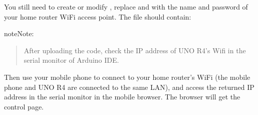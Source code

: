 \documentclass[a4paper,11pt,english]{sphinxmanual}
\begin{document}
\sphinxAtStartPar
You still need to create or modify , replace  and  with the name and password of your home router WiFi access point. The file should contain:

\begin{sphinxVerbatim}[commandchars=\\\{\}]
\end{sphinxVerbatim}

\begin{sphinxadmonition}{note}{Note:}\begin{quote}

\sphinxAtStartPar
After uploading the code, check the IP address of UNO R4’s Wifi in the serial monitor of Arduino IDE.

\end{quote}

\sphinxAtStartPar
Then use your mobile phone to connect to your home router’s WiFi (the mobile phone and UNO R4 are connected to the same LAN), and access the returned IP address in the serial monitor in the mobile browser. The browser will get the control page.
\end{sphinxadmonition}

\end{document}

